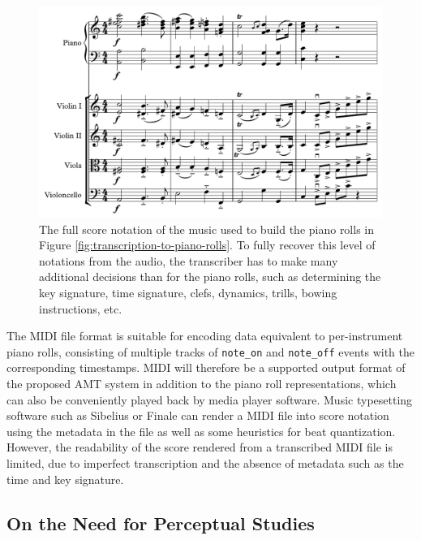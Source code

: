 \begin{figure}
	\includegraphics[width=\textwidth]{march-score.pdf}
	\caption{The full score notation of the music used to build the piano rolls in Figure \ref{fig:transcription-to-piano-rolls}. To fully recover this level of notations from the audio, the transcriber has to make many additional decisions than for the piano rolls, such as determining the key signature, time signature, clefs, dynamics, trills, bowing instructions, etc.}\label{fig:wedding-march-score}
\end{figure}


The MIDI file format is suitable for encoding data equivalent to per-instrument piano rolls, consisting of multiple tracks of \texttt{note\_on} and \texttt{note\_off} events with the corresponding timestamps.
MIDI will therefore be a supported output format of the proposed AMT system in addition to the piano roll representations, which can also be conveniently played back by media player software.
Music typesetting software such as Sibelius or Finale can render a MIDI file into score notation using the metadata in the file as well as some heuristics for beat quantization.
However, the readability of the score rendered from a transcribed MIDI file is limited, due to imperfect transcription and the absence of metadata such as the time and key signature.



\subsection{On the Need for Perceptual Studies}

